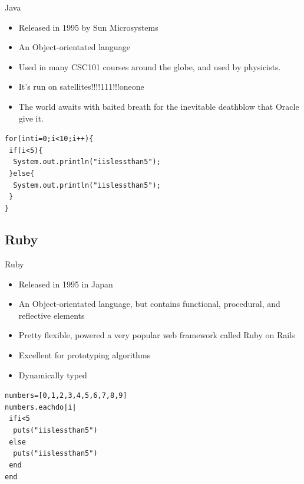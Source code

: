 \documentclass[10pt]{beamer}
\begin{document}
\begin{frame}{Java}

	\begin{itemize}
		\item Released in 1995 by Sun Microsystems
		\item An Object-orientated language
		\item Used in many CSC101 courses around the globe, and used by physicists.
		\item It's run on satellites!!!!111!!!oneone 
		\item The world awaits with baited breath for the inevitable deathblow that Oracle give it.
	\end{itemize}
	
	\begin{alltt}
	for(int i=0;i<10;i++) \{ \\
		~if(i<5) \{        \\
			~~System.out.println("i is less than 5"); \\
		~\} else \{                                      \\
			~~System.out.println("i is less than 5"); \\
		~\} \\
	\} \\
	\end{alltt}

\end{frame}

\subsection{Ruby}

\begin{frame}{Ruby}

	\begin{itemize}
		\item Released in 1995 in Japan
		\item An Object-orientated language, but contains functional, procedural, and reflective elements
		\item Pretty flexible, powered a very popular web framework called Ruby on Rails
		\item Excellent for prototyping algorithms 
		\item Dynamically typed
	\end{itemize}
	
	\begin{alltt}
	numbers = [0,1,2,3,4,5,6,7,8,9] \\
	numbers.each do |i| \\
		~if i<5         \\
			~~ puts("i is less than 5") \\
		~else                                      \\
			~~ puts("i is less than 5") \\
		~end \\
	end \\
	\end{alltt}

\end{frame}
\end{document}
